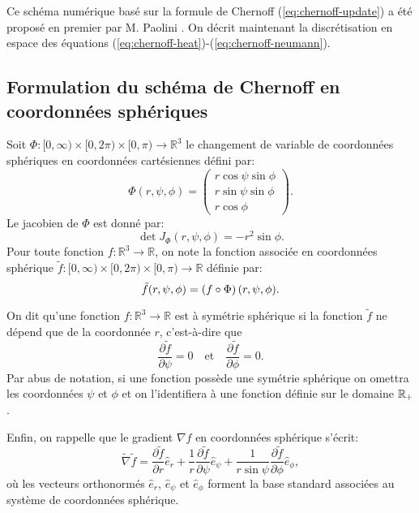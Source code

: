Ce schéma numérique basé sur la formule de Chernoff
(\ref{eq:chernoff-update}) a été proposé en premier par M. Paolini
\cite{Paolini1988}. On décrit maintenant la discrétisation en
espace des équations (\ref{eq:chernoff-heat})-(\ref{eq:chernoff-neumann}).


\subsection*{Formulation du schéma de Chernoff en coordonnées sphériques}
Soit $\Phi:[0,\infty)\times[0,2\pi)\times[0,\pi)\to\mathbb R^3$ le
changement de variable de coordonnées sphériques en coordonnées
cartésiennes défini par:
\begin{equation}
  \Phi(r, \psi, \phi) = \begin{pmatrix}
    r\cos\psi\sin\phi\\
    r\sin\psi\sin\phi\\
    r\cos\phi
  \end{pmatrix}.
\end{equation}
Le jacobien de $\Phi$ est donné par:
\begin{equation}\label{eq:spherical-jacobian}
  \det J_\Phi(r, \psi,\phi) = -r^2\sin\phi.
\end{equation}
Pour toute fonction $f:\mathbb R^3\to\mathbb R$, on note la fonction
associée en coordonnées sphérique $\tilde
f:[0,\infty)\times[0,2\pi)\times[0,\pi)\to\mathbb R$ définie par:
\begin{equation}
  \tilde f(r, \psi, \phi) = \left( f \circ \Phi \right)(r, \psi, \phi).
\end{equation}

On dit qu'une fonction $f:\mathbb R^3\to\mathbb R$ est à symétrie
sphérique si la fonction $\tilde f$ ne dépend que de la coordonnée
$r$, c'est-à-dire que
\begin{equation}\label{eq:spherical-symmetry}
  \frac{\partial \tilde f}{\partial \psi} = 0 %
  \quad \text{et} \quad %
  \frac{\partial \tilde f}{\partial \phi} = 0.
\end{equation}
Par abus de notation, si une fonction possède une symétrie
sphérique on omettra les coordonnées $\psi$ et $\phi$ et on
l'identifiera à une fonction définie sur le domaine $\mathbb R_+$.

Enfin, on rappelle que le gradient $\nabla f$ en coordonnées
sphérique s'écrit:
\begin{equation}\label{eq:spherical-gradient}
  \tilde\nabla \tilde f = %
  \frac{\partial \tilde f}{\partial r} \hat e_r %
  + \frac{1}{r}\frac{\partial \tilde f}{\partial \psi}\hat e_\psi %
  + \frac{1}{r\sin\psi}\frac{\partial \tilde f}{\partial \phi} \hat e_\phi,
\end{equation}
où les vecteurs orthonormés $\hat e_r$, $\hat e_\psi$ et $\hat
e_\phi$ forment la base standard associées au système de
coordonnées sphérique.

